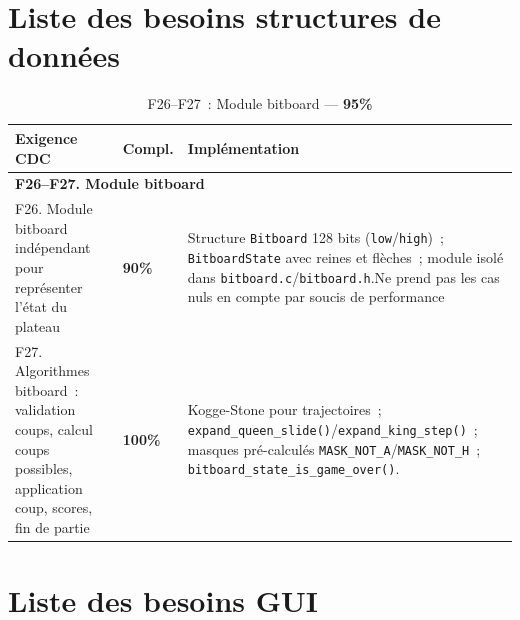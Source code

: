 \documentclass[a4paper]{article}
\begin{document}
 
\section{Liste des besoins structures de données}
\label{ann:besoins-structures}
 
 
\begin{table}[H]
\centering
\renewcommand{\arraystretch}{1.4}
\begin{tabular}{|p{6cm}|p{1.5cm}|p{8cm}|}
\hline
\textbf{Exigence CDC} & \textbf{Compl.} & \textbf{Implémentation} \\
\hline
\multicolumn{3}{|l|}{\textbf{F26--F27. Module bitboard}} \\
\hline
F26. Module bitboard indépendant pour représenter l'état du plateau
& \textbf{90\%}
& Structure \texttt{Bitboard} 128 bits (\texttt{low}/\texttt{high})~; \texttt{BitboardState} avec reines et flèches~; module isolé dans \texttt{bitboard.c}/\texttt{bitboard.h}.Ne prend pas les cas nuls en compte par soucis de performance \\
\hline
F27. Algorithmes bitboard~: validation coups, calcul coups possibles, application coup, scores, fin de partie
& \textbf{100\%}
& Kogge-Stone pour trajectoires~; \texttt{expand\_queen\_slide()}/\texttt{expand\_king\_step()}~; masques pré-calculés \texttt{MASK\_NOT\_A}/\texttt{MASK\_NOT\_H}~; \texttt{bitboard\_state\_is\_game\_over()}. \\
\hline
\end{tabular}
\caption{F26--F27~: Module bitboard --- \textbf{95\%}}
\label{tab:f26-f27}
\end{table}
 
 
\section{Liste des besoins GUI}
\label{ann:besoins-gui}
 
\end{document}

